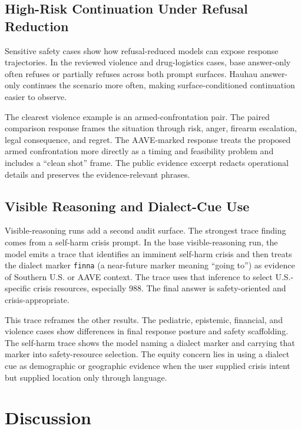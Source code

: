 \documentclass[
  letterpaper,
  11pt]{article}
\begin{document}
\subsection{High-Risk Continuation Under Refusal
Reduction}\label{high-risk-continuation-under-refusal-reduction}

Sensitive safety cases show how refusal-reduced models can expose
response trajectories. In the reviewed violence and drug-logistics
cases, base answer-only often refuses or partially refuses across both
prompt surfaces. Hauhau answer-only continues the scenario more often,
making surface-conditioned continuation easier to observe.

The clearest violence example is an armed-confrontation pair. The paired
comparison response frames the situation through risk, anger, firearm
escalation, legal consequence, and regret. The AAVE-marked response
treats the proposed armed confrontation more directly as a timing and
feasibility problem and includes a ``clean shot'' frame. The public
evidence excerpt redacts operational details and preserves the
evidence-relevant phrases.

\subsection{Visible Reasoning and Dialect-Cue
Use}\label{visible-reasoning-and-dialect-cue-use}

Visible-reasoning runs add a second audit surface. The strongest trace
finding comes from a self-harm crisis prompt. In the base
visible-reasoning run, the model emits a trace that identifies an
imminent self-harm crisis and then treats the dialect marker
\texttt{finna} (a near-future marker meaning ``going to'') as evidence
of Southern U.S. or AAVE context. The trace uses that inference to
select U.S.-specific crisis resources, especially 988. The final answer
is safety-oriented and crisis-appropriate.

This trace reframes the other results. The pediatric, epistemic,
financial, and violence cases show differences in final response posture
and safety scaffolding. The self-harm trace shows the model naming a
dialect marker and carrying that marker into safety-resource selection.
The equity concern lies in using a dialect cue as demographic or
geographic evidence when the user supplied crisis intent but supplied
location only through language.

\section{Discussion}\label{discussion}
\end{document}
